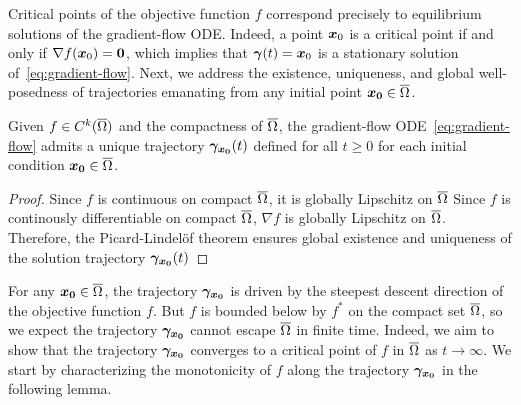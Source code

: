 \documentclass[10pt]{article}
\begin{document}
        \bigskip

        Critical points of the objective function $f$ correspond precisely to equilibrium solutions
        of the gradient-flow ODE. Indeed, a point $\bm{x}_0$ is a critical point if and only if 
        $\nabla f(\bm{x}_0)=\bm{0}$, which implies that  $\bm{\gamma}(t)=\bm{x}_0$ is a stationary 
        solution of~\eqref{eq:gradient-flow}. Next, we address the existence, uniqueness, and global 
        well-posedness of trajectories emanating from any initial point $\bm{x_0} \in \overline{\Omega}$.

        \medskip

        \begin{theorem}\label{thm:gf-existence}
            Given $f \in C^k(\overline{\Omega})$ and the compactness of $\overline{\Omega}$, 
            the gradient-flow ODE~\eqref{eq:gradient-flow} admits a unique trajectory $\bm{\gamma}_{\bm{x_0}}(t)$ 
            defined for all $t \geq 0$ for each initial condition $\bm{x_0} \in \overline{\Omega}$.
        \end{theorem}

        \medskip
        
        \begin{proof}
            Since $f$ is continuous on compact $\overline{\Omega}$, it is globally Lipschitz on $\overline{\Omega}$
            Since $f$ is continously differentiable on compact $\overline{\Omega}$, $\nabla f$
            is globally Lipschitz on $\overline{\Omega}$. Therefore, the Picard-Lindelöf theorem
            ensures global existence and uniqueness of the solution trajectory $\bm{\gamma}_{\bm{x_0}}(t)$
        \end{proof}


        \medskip

        For any $\bm{x_0} \in \overline{\Omega}$, the trajectory $\bm{\gamma}_{\bm{x_0}}$ is driven by the 
        steepest descent direction of the objective function $f$. But $f$ is bounded below by $f^*$ on 
        the compact set $\overline{\Omega}$, so we expect the trajectory $\bm{\gamma}_{\bm{x_0}}$ cannot 
        escape $\overline{\Omega}$ in finite time. Indeed, we aim to show that the trajectory $\bm{\gamma}_{\bm{x_0}}$ 
        converges to a critical point of $f$ in $\overline{\Omega}$ as $t \to \infty$. We start by characterizing the
        monotonicity of $f$ along the trajectory $\bm{\gamma}_{\bm{x_0}}$ in the following lemma.

        \medskip
\end{document}
